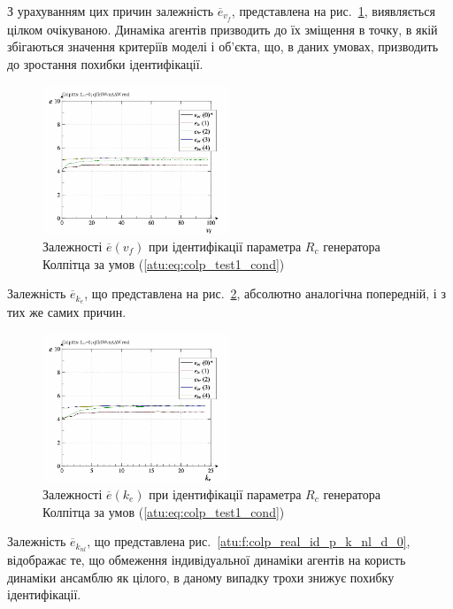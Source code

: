 З урахуванням цих причин залежність
$ \overline{e}_{v_f} $, представлена на рис.~\ref{atu:f:colp_real_id_p_v_f_d_0},
виявляється цілком очікуваною. Динаміка агентів призводить
до їх зміщення в точку, в якій збігаються значення критеріїв
моделі і об'єкта, що, в даних умовах, призводить до зростання
похибки ідентифікації.

\begin{figure}[htb!]
  \centerline{\includegraphics[width=0.50\textwidth]{p/r/colp_real_id-p_v_f_d_0.png} }
\caption{Залежності $ \overline{e} (v_f) $ при ідентифікації параметра $ R_c $ генератора Колпітца за умов (\ref{atu:eq:colp_test1_cond})}
  \label{atu:f:colp_real_id_p_v_f_d_0}
\end{figure}

Залежність
$ \overline{e}_{k_e} $, що представлена на рис.~\ref{atu:f:colp_real_id_p_k_e_d_0},
абсолютно аналогічна попередній, і з тих же самих причин.

\begin{figure}[htb!]
  \centerline{\includegraphics[width=0.50\textwidth]{p/r/colp_real_id-p_k_e_d_0.png} }
\caption{Залежності $ \overline{e} (k_e) $ при ідентифікації параметра $ R_c $ генератора Колпітца за умов (\ref{atu:eq:colp_test1_cond})}
\label{atu:f:colp_real_id_p_k_e_d_0}
\end{figure}

Залежність
$ \overline{e}_{k_{nl}} $, що представлена рис.~\ref{atu:f:colp_real_id_p_k_nl_d_0},
відображає те, що обмеження індивідуальної динаміки агентів
на користь динаміки ансамблю як цілого, в даному випадку трохи
знижує похибку ідентифікації.

